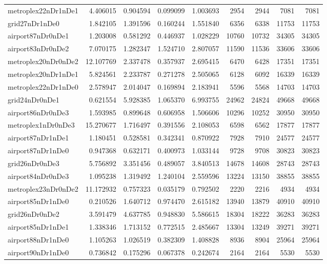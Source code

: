 \begin{longtable}{|l|r|r|r|r|r|r|r|r|}
metroplex22nDr1nDe1 & 4.406015 & 0.904594 & 0.099099 & 1.003693 & 2954 & 2944 & 7081 & 7081 \\
grid27nDr1nDe0 & 1.842105 & 1.391596 & 0.160244 & 1.551840 & 6356 & 6338 & 11753 & 11753 \\
airport87nDr0nDe1 & 1.203008 & 0.581292 & 0.446937 & 1.028229 & 10760 & 10732 & 34305 & 34305 \\
airport83nDr0nDe2 & 7.070175 & 1.282347 & 1.524710 & 2.807057 & 11590 & 11536 & 33606 & 33606 \\
metroplex20nDr0nDe2 & 12.107769 & 2.337478 & 0.357937 & 2.695415 & 6470 & 6428 & 17351 & 17351 \\
metroplex20nDr1nDe1 & 5.824561 & 2.233787 & 0.271278 & 2.505065 & 6128 & 6092 & 16339 & 16339 \\
metroplex22nDr1nDe0 & 2.578947 & 2.014047 & 0.169894 & 2.183941 & 5596 & 5568 & 14703 & 14703 \\
grid24nDr0nDe1 & 0.621554 & 5.928385 & 1.065370 & 6.993755 & 24962 & 24824 & 49668 & 49668 \\
airport86nDr0nDe3 & 1.593985 & 0.899648 & 0.606958 & 1.506606 & 10296 & 10252 & 30950 & 30950 \\
metroplex1nDr0nDe3 & 15.270677 & 1.716497 & 0.391556 & 2.108053 & 6598 & 6562 & 17877 & 17877 \\
airport87nDr1nDe1 & 1.180451 & 0.528581 & 0.342341 & 0.870922 & 7928 & 7910 & 24577 & 24577 \\
airport87nDr1nDe0 & 0.947368 & 0.632171 & 0.400973 & 1.033144 & 9728 & 9708 & 30823 & 30823 \\
grid26nDr0nDe3 & 5.756892 & 3.351456 & 0.489057 & 3.840513 & 14678 & 14608 & 28743 & 28743 \\
airport84nDr0nDe3 & 1.095238 & 1.319492 & 1.240104 & 2.559596 & 13224 & 13150 & 38855 & 38855 \\
metroplex23nDr0nDe2 & 11.172932 & 0.757323 & 0.035179 & 0.792502 & 2220 & 2216 & 4934 & 4934 \\
airport85nDr1nDe0 & 0.210526 & 1.640712 & 0.974470 & 2.615182 & 13940 & 13879 & 40910 & 40910 \\
grid26nDr0nDe2 & 3.591479 & 4.637785 & 0.948830 & 5.586615 & 18304 & 18222 & 36283 & 36283 \\
airport85nDr1nDe1 & 1.338346 & 1.713152 & 0.772515 & 2.485667 & 13304 & 13249 & 39271 & 39271 \\
airport88nDr1nDe0 & 1.105263 & 1.026519 & 0.382309 & 1.408828 & 8936 & 8904 & 25964 & 25964 \\
airport90nDr1nDe0 & 0.736842 & 0.175296 & 0.067378 & 0.242674 & 2164 & 2164 & 5530 & 5530 \\

\end{longtable}
